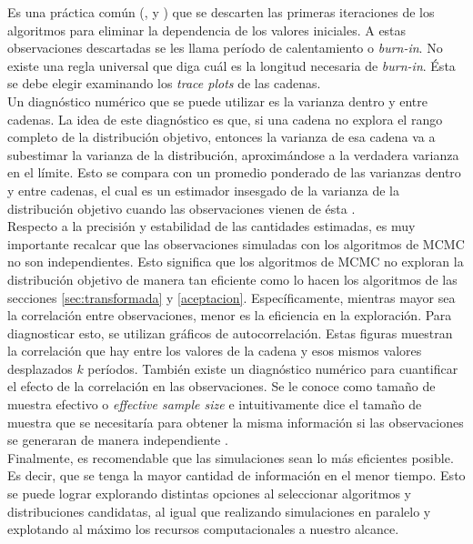 \documentclass[11pt,a4paper]{article}
\begin{document}
Es una práctica común (\citet{kruschke}, \citet{gelman} y \citet{casella}) que se descarten las primeras iteraciones de los algoritmos para eliminar la dependencia de los valores iniciales. A estas observaciones descartadas se les llama período de calentamiento o \textit{burn-in}. No existe una regla universal que diga cuál es la longitud necesaria de \textit{burn-in}. Ésta se debe elegir examinando los \textit{trace plots} de las cadenas.\\

Un diagnóstico numérico que se puede utilizar es la varianza dentro y entre cadenas. La idea de este diagnóstico es que, si una cadena no explora el rango completo de la distribución objetivo, entonces la varianza de esa cadena va a subestimar la varianza de la distribución, aproximándose a la verdadera varianza en el límite. Esto se compara con un promedio ponderado de las varianzas dentro y entre cadenas, el cual es un estimador insesgado de la varianza de la distribución objetivo cuando las observaciones vienen de ésta \citep{gelman}.\\

Respecto a la precisión y estabilidad de las cantidades estimadas, es muy importante recalcar que las observaciones simuladas con los algoritmos de MCMC no son independientes. Esto significa que los algoritmos de MCMC no exploran la distribución objetivo de manera tan eficiente como lo hacen los algoritmos de las secciones \ref{sec:transformada} y \ref{aceptacion}. Específicamente, mientras mayor sea la correlación entre observaciones, menor es la eficiencia en la exploración. Para diagnosticar esto, se utilizan gráficos de autocorrelación. Estas figuras muestran la correlación que hay entre los valores de la cadena y esos mismos valores desplazados $k$ períodos. También existe un diagnóstico numérico para cuantificar el efecto de la correlación en las observaciones. Se le conoce como tamaño de muestra efectivo o \textit{effective sample size} e intuitivamente dice el tamaño de muestra que se necesitaría para obtener la misma información si las observaciones se generaran de manera independiente \citep{kruschke}.\\

Finalmente, es recomendable que las simulaciones sean lo más eficientes posible. Es decir, que se tenga la mayor cantidad de información en el menor tiempo. Esto se puede lograr explorando distintas opciones al seleccionar algoritmos y distribuciones candidatas, al igual que realizando simulaciones en paralelo y explotando al máximo los recursos computacionales a nuestro alcance.\\
\end{document}
